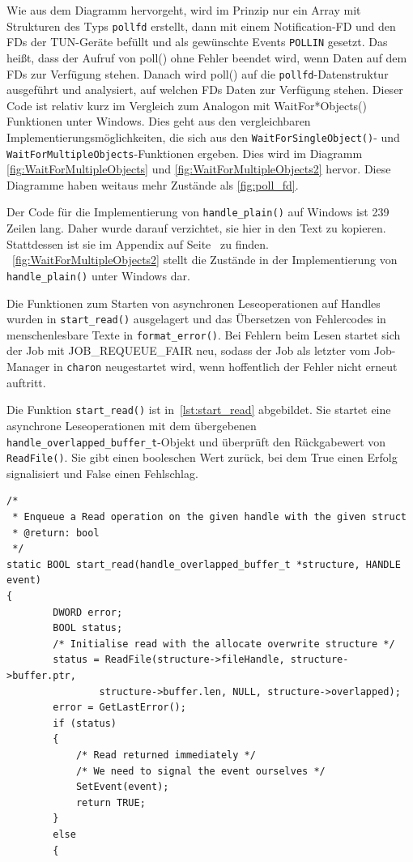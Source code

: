 {Wie aus dem Diagramm hervorgeht, wird im Prinzip nur ein Array mit Strukturen des Typs
\texttt{pollfd} erstellt, dann mit einem Notification-\ac{FD} und den \acp{FD} der TUN-Geräte befüllt
und als gewünschte Events \texttt{POLLIN} gesetzt. Das heißt, dass der Aufruf von poll() ohne
Fehler beendet wird, wenn Daten auf dem \acp{FD} zur Verfügung stehen.
Danach wird poll() auf die \texttt{pollfd}-Datenstruktur ausgeführt und analysiert,
auf welchen \acp{FD} Daten zur Verfügung stehen. Dieser Code ist relativ kurz im
Vergleich zum Analogon mit WaitFor*Objects() Funktionen unter Windows.
Dies geht aus den vergleichbaren Implementierungsmöglichkeiten, die sich aus den
\texttt{WaitForSingleObject()}- und \texttt{WaitForMultipleObjects}-Funktionen ergeben.
Dies wird im Diagramm \autoref{fig:WaitForMultipleObjects}
und \autoref{fig:WaitForMultipleObjects2} hervor. Diese Diagramme haben weitaus
mehr Zustände als \autoref{fig:poll_fd}. 

Der Code für die Implementierung von \texttt{handle\_plain()} auf Windows ist 239 Zeilen lang.
Daher wurde darauf verzichtet, sie hier in den Text zu kopieren. Stattdessen ist sie
im Appendix auf Seite~\pageref{lst:handle-plain-windows} zu finden.
~\autoref{fig:WaitForMultipleObjects2} stellt die Zustände in der Implementierung
von \texttt{handle\_plain()} unter Windows dar.

Die Funktionen zum Starten von asynchronen Leseoperationen auf Handles
wurden in \texttt{start\_read()} ausgelagert und das Übersetzen von Fehlercodes in menschenlesbare
Texte in \texttt{format\_error()}. Bei Fehlern beim Lesen startet sich der Job
mit JOB\_REQUEUE\_FAIR neu, sodass der Job als letzter vom Job-Manager in \texttt{charon} neugestartet wird,
wenn hoffentlich der Fehler nicht erneut auftritt.

Die Funktion \texttt{start\_read()} ist in~\autoref{lst:start_read} abgebildet.
Sie startet eine asynchrone Leseoperationen mit dem übergebenen \texttt{handle\_overlapped\_buffer\_t}-Objekt
und überprüft den Rückgabewert von \texttt{ReadFile()}. Sie gibt einen booleschen Wert
zurück, bei dem True einen Erfolg signalisiert und False einen Fehlschlag.

\begin{lstlisting}[caption=Code von start\_read(),label=lst:start_read]
/*
 * Enqueue a Read operation on the given handle with the given struct
 * @return: bool
 */
static BOOL start_read(handle_overlapped_buffer_t *structure, HANDLE event)
{
        DWORD error;
        BOOL status;
        /* Initialise read with the allocate overwrite structure */
        status = ReadFile(structure->fileHandle, structure->buffer.ptr,
                structure->buffer.len, NULL, structure->overlapped);
        error = GetLastError();
        if (status)
        {
            /* Read returned immediately */
            /* We need to signal the event ourselves */
            SetEvent(event);
            return TRUE;
        }
        else
        {


\end{lstlisting}}
